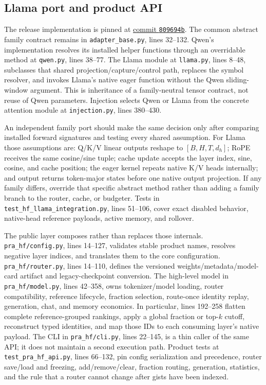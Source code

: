 \documentclass[11pt]{article}
\begin{document}
\subsection{Llama port and product API}

The release implementation is pinned at
\href{https://github.com/einnovator/pdattention/tree/809694b}{commit \texttt{809694b}}.
The common abstract family contract remains in \texttt{adapter\_base.py}, lines 32--132.
Qwen's implementation resolves its installed helper functions through an overridable method at
\texttt{qwen.py}, lines 38--77. The Llama module at \texttt{llama.py}, lines 8--48, subclasses
that shared projection/capture/control path, replaces the symbol resolver, and invokes Llama's
native eager function without the Qwen sliding-window argument. This is inheritance of a
family-neutral tensor contract, not reuse of Qwen parameters. Injection selects Qwen or Llama
from the concrete attention module at \texttt{injection.py}, lines 380--430.

An independent family port should make the same decision only after comparing installed forward
signatures and testing every shared assumption. For Llama those assumptions are: Q/K/V linear
outputs reshape to $[B,H,T,d_h]$; RoPE receives the same cosine/sine tuple; cache update accepts
the layer index, sine, cosine, and cache position; the eager kernel repeats native K/V heads
internally; and output returns token-major states before one native output projection. If any
family differs, override that specific abstract method rather than adding a family branch to the
router, cache, or budgeter. Tests in \texttt{test\_hf\_llama\_integration.py}, lines 51--106,
cover exact disabled behavior, native-head reference payloads, active memory, and rollover.

The public layer composes rather than replaces those internals. \texttt{pra\_hf/config.py},
lines 14--127, validates stable product names, resolves negative layer indices, and translates
them to the core configuration. \texttt{pra\_hf/router.py}, lines 14--110, defines the versioned
weights/metadata/model-card artifact and legacy-checkpoint conversion. The high-level model in
\texttt{pra\_hf/model.py}, lines 42--358, owns tokenizer/model loading, router compatibility,
reference lifecycle, fraction selection, route-once identity replay, generation, chat, and
memory economics. In particular, lines 192--258 flatten complete reference-grouped rankings,
apply a global fraction or top-$k$ cutoff, reconstruct typed identities, and map those IDs to
each consuming layer's native payload. The CLI in \texttt{pra\_hf/cli.py}, lines 22--145, is a
thin caller of the same API; it does not maintain a second execution path. Product tests at
\texttt{test\_pra\_hf\_api.py}, lines 66--132, pin config serialization and precedence, router
save/load and freezing, add/remove/clear, fraction routing, generation, statistics, and the rule
that a router cannot change after gists have been indexed.
\end{document}
